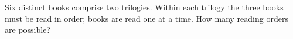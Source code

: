 Six distinct books comprise two trilogies. Within each trilogy the three books must be read in order; books are read one at a time. How many reading orders are possible?
